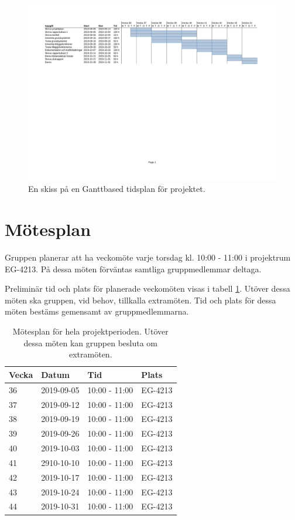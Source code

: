 \documentclass[a4paper]{article}
\begin{document}
\begin{figure}[h]
\centering
\includegraphics[trim={2cm 12cm 2cm 0}, clip, scale=0.525]{figurer/tidsplan.pdf}
\caption{En skiss på en Ganttbased tidsplan för projektet.}
\label{figur:tidsplan}
\end{figure}

\section{Mötesplan}
\label{sec:mötesplan}

Gruppen planerar att ha veckomöte varje torsdag kl. 10:00 - 11:00 i projektrum EG-4213. På dessa möten förväntas samtliga gruppmedlemmar deltaga.

Preliminär tid och plats för planerade veckomöten visas i tabell \ref{tabell:möten}. Utöver dessa möten ska gruppen, vid behov, tillkalla extramöten. Tid och plats för dessa möten bestäms gemensamt av gruppmedlemmarna.

\begin{table}
\centering
\begin{tabular}{| l | l | l | l |} 
\hline
\textbf{Vecka} & \textbf{Datum} & \textbf{Tid} & \textbf{Plats} \\ \hline
36 & 2019-09-05 & 10:00 - 11:00 & EG-4213 \\ \hline
37 & 2019-09-12 & 10:00 - 11:00 & EG-4213 \\ \hline
38 & 2019-09-19 & 10:00 - 11:00 & EG-4213 \\ \hline
39 & 2019-09-26 & 10:00 - 11:00 & EG-4213 \\ \hline
40 & 2019-10-03 & 10:00 - 11:00 & EG-4213 \\ \hline
41 & 2910-10-10 & 10:00 - 11:00 & EG-4213 \\ \hline
42 & 2019-10-17 & 10:00 - 11:00 & EG-4213 \\ \hline
43 & 2019-10-24 & 10:00 - 11:00 & EG-4213 \\ \hline
44 & 2019-10-31 & 10:00 - 11:00 & EG-4213 \\ \hline
\end{tabular}
\caption{Mötesplan för hela projektperioden. Utöver dessa möten kan gruppen besluta om extramöten.}
\label{tabell:möten}
\end{table}
\end{document}
